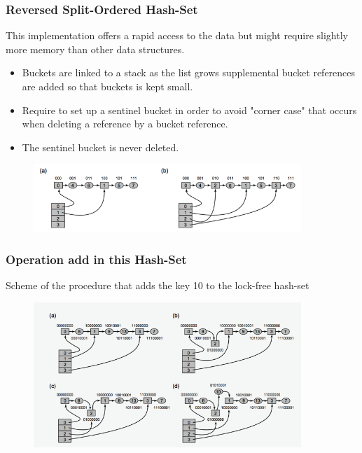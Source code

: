 \documentclass{bredelebeamer}
\begin{document}
\begin{frame}
  \frametitle{Reversed Split-Ordered Hash-Set}
  
  This implementation offers a rapid access to the data but might require
  slightly more memory than other data structures.
  
  \begin{itemize}
  \item Buckets are linked to a stack as the list grows supplemental bucket
    references are added so that buckets is kept small.
  \item Require to set up a sentinel bucket in order to avoid "corner case" that
    occurs when deleting a reference by a bucket reference.
  \item The sentinel bucket is never deleted.
  \end{itemize}
  
  \begin{figure}
    \centering
    \includegraphics[width=0.9\textwidth]{../report/images/hashsetFig1.png}
    \caption{}
    \label{fig:}
  \end{figure}
\end{frame}

\begin{frame}
  \frametitle{Operation add in this Hash-Set}
  Scheme of the procedure that adds the key 10 to the lock-free hash-set
  \begin{figure}
    \centering
    \includegraphics[width=0.9\textwidth]{../report/images/hashsetFig2.png}
  \end{figure}
\end{frame}
\end{document}
